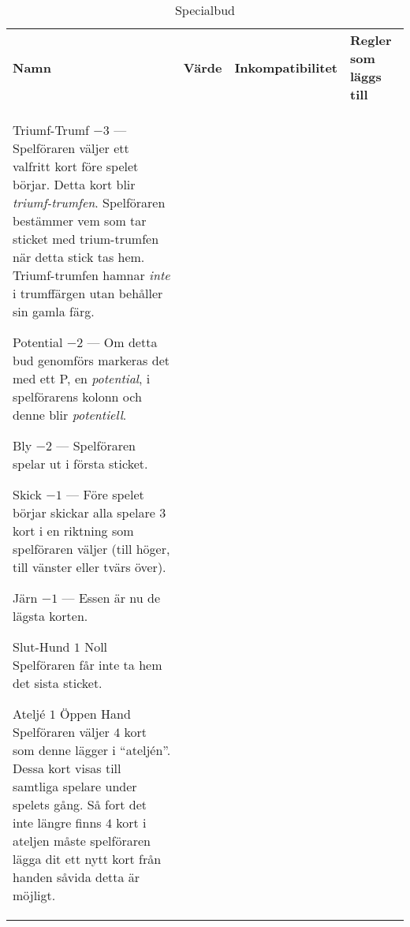 %
%
%

\newcommand{\nonTrump}{\textnormal{icke-trumf-bud}}

\begin{table}
	\caption{Specialbud}\label{tab:specialBids}
	\begin{center}
		\begin{tabularx}{\textwidth}{lcp{3cm}|X}
			\textbf{Namn} &
			\textbf{Värde} &
			\textbf{Inkompatibilitet} &
			\textbf{Regler som läggs till}
			\\[-3ex]

			\specialBidItem%
			{Triumf-Trumf}
			{$-3$}
			{---}
			{%
				Spelföraren väljer ett valfritt kort före spelet börjar. Detta kort blir \emph{triumf-trumfen}. Spelföraren bestämmer vem som tar sticket med trium-trumfen när detta stick tas hem. Triumf-trumfen hamnar \emph{inte} i trumffärgen utan behåller sin gamla färg.
			}

			\specialBidItem%
			{Potential}
			{$-2$}
			{---}
			{%
				Om detta bud genomförs markeras det med ett P, en \emph{potential}, i spelförarens kolonn och denne blir \emph{potentiell}.
			}

			\specialBidItem%
			{Bly}
			{$-2$}
			{---}
			{%
				Spelföraren spelar ut i första sticket.
			}

			\specialBidItem%
			{Skick}
			{$-1$}
			{---}
			{%
				Före spelet börjar skickar alla spelare $3$ kort i en riktning som spelföraren väljer (till höger, till vänster eller tvärs över).
			}

			\specialBidItem%
			{Järn}
			{$-1$}
			{---}
			{%
				Essen är nu de lägsta korten.
			}

			\specialBidItem%
			{Slut-Hund}
			{$1$}
			{Noll}
			{%
				Spelföraren får inte ta hem det sista sticket.
			}

			\specialBidItem%
			{Ateljé}
			{$1$}
			{Öppen Hand}
			{%
				Spelföraren väljer $4$ kort som denne lägger i ``ateljén''. Dessa kort visas till samtliga spelare under spelets gång. Så fort det inte längre finns $4$ kort i ateljen måste spelföraren lägga dit ett nytt kort från handen såvida detta är möjligt.
			}


\end{tabularx}
\end{center}
\end{table}
